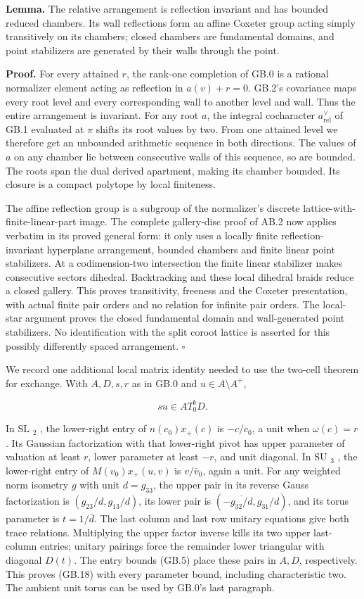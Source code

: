 \documentclass[
  11pt,
]{article}
\begin{document}
\textbf{Lemma.} The relative arrangement is reflection invariant and has
bounded reduced chambers. Its wall reflections form an affine Coxeter
group acting simply transitively on its chambers; closed chambers are
fundamental domains, and point stabilizers are generated by their walls
through the point.

\textbf{Proof.} For every attained \(r\), the rank-one completion of
GB.0 is a rational normalizer element acting as reflection in
\(a(v)+r=0\). GB.2's covariance maps every root level and every
corresponding wall to another level and wall. Thus the entire
arrangement is invariant. For any root \(a\), the integral cocharacter
\(a^\vee_{\mathrm{rel}}\) of GB.1 evaluated at \(\pi\) shifts its root
values by two. From one attained level we therefore get an unbounded
arithmetic sequence in both directions. The values of \(a\) on any
chamber lie between consecutive walls of this sequence, so are bounded.
The roots span the dual derived apartment, making its chamber bounded.
Its closure is a compact polytope by local finiteness.

The affine reflection group is a subgroup of the normalizer's discrete
lattice-with-finite-linear-part image. The complete gallery-disc proof
of AB.2 now applies verbatim in its proved general form: it only uses a
locally finite reflection-invariant hyperplane arrangement, bounded
chambers and finite linear point stabilizers. At a codimension-two
intersection the finite linear stabilizer makes consecutive sectors
dihedral. Backtracking and these local dihedral braids reduce a closed
gallery. This proves transitivity, freeness and the Coxeter
presentation, with actual finite pair orders and no relation for
infinite pair orders. The local-star argument proves the closed
fundamental domain and wall-generated point stabilizers. No
identification with the split coroot lattice is asserted for this
possibly differently spaced arrangement. \(\square\)

We record one additional local matrix identity needed to use the
two-cell theorem for exchange. With \(A,D,s,r\) as in GB.0 and
\(u\in A\setminus A^+\),

\[
 s u\in A T_0^b D.
 \tag{GB.18}
\]

In SL \(_2\) , the lower-right entry of \(n(c_0)x_+(c)\) is \(-c/c_0\),
a unit when \(\omega(c)=r\). Its Gaussian factorization with that
lower-right pivot has upper parameter of valuation at least \(r\), lower
parameter at least \(-r\), and unit diagonal. In SU \(_3\) , the
lower-right entry of \(M(v_0)x_+(u,v)\) is \(v/\bar v_0\), again a unit.
For any weighted norm isometry \(g\) with unit \(d=g_{33}\), the upper
pair in its reverse Gauss factorization is \((g_{23}/d,g_{13}/d)\), its
lower pair is \((-\overline{g_{32}/d},g_{31}/d)\), and its torus
parameter is \(t=1/\bar d\). The last column and last row unitary
equations give both trace relations. Multiplying the upper factor
inverse kills its two upper last-column entries; unitary pairings force
the remainder lower triangular with diagonal \(D(t)\). The entry bounds
(GB.5) place these pairs in \(A,D\), respectively. This proves (GB.18)
with every parameter bound, including characteristic two. The ambient
unit torus can be used by GB.0's last paragraph.
\end{document}
